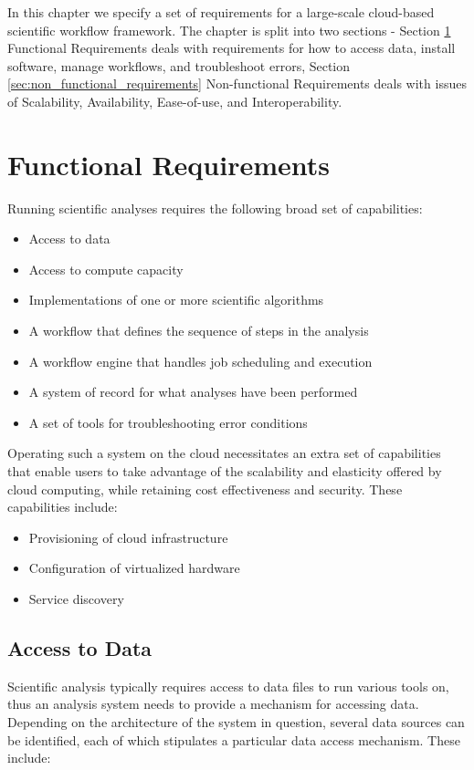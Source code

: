 In this chapter we specify a set of requirements for a large-scale cloud-based scientific workflow framework. The chapter is split into two sections - Section \ref{sec:functional_requirements} Functional Requirements deals with requirements for how to access data, install software, manage workflows, and troubleshoot errors, Section \ref{sec:non_functional_requirements} Non-functional Requirements deals with issues of Scalability, Availability, Ease-of-use, and Interoperability.

\section{Functional Requirements}\label{sec:functional_requirements}

Running scientific analyses requires the following broad set of capabilities:
\begin{itemize}
\item Access to data
\item Access to compute capacity
\item Implementations of one or more scientific algorithms
\item A workflow that defines the sequence of steps in the analysis
\item A workflow engine that handles job scheduling and execution
\item A system of record for what analyses have been performed
\item A set of tools for troubleshooting error conditions
\end{itemize}

Operating such a system on the cloud necessitates an extra set of capabilities that enable users to take advantage of the scalability and elasticity offered by cloud computing, while retaining cost effectiveness and security. These capabilities include:
\begin{itemize}
\item Provisioning of cloud infrastructure
\item Configuration of virtualized hardware
\item Service discovery
\end{itemize}

\subsection {Access to Data} \label{sec:access_to_data}

Scientific analysis typically requires access to data files to run various tools on, thus an analysis system needs to provide a mechanism for accessing data. Depending on the architecture of the system in question, several data sources can be identified, each of which stipulates a particular data access mechanism. These include:

